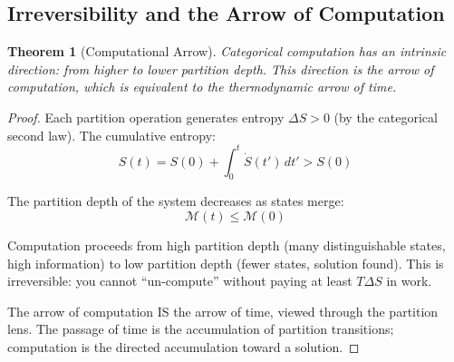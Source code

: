 \documentclass[twocolumn,10pt]{article}
\newtheorem{theorem}{Theorem}[section]
\theoremstyle{remark}
\newcommand{\Depth}{\mathcal{M}}
\begin{document}
\subsection{Irreversibility and the Arrow of Computation}

\begin{theorem}[Computational Arrow]
\label{thm:arrow}
Categorical computation has an intrinsic direction: from higher to lower partition depth. This direction is the \emph{arrow of computation}, which is equivalent to the thermodynamic arrow of time.
\end{theorem}

\begin{proof}
Each partition operation generates entropy $\Delta S > 0$ (by the categorical second law). The cumulative entropy:
\begin{equation}
    S(t) = S(0) + \int_0^t \dot{S}(t') \, dt' > S(0)
\end{equation}

The partition depth of the system decreases as states merge:
\begin{equation}
    \Depth(t) \leq \Depth(0)
\end{equation}

Computation proceeds from high partition depth (many distinguishable states, high information) to low partition depth (fewer states, solution found). This is irreversible: you cannot ``un-compute'' without paying at least $T\Delta S$ in work.

The arrow of computation IS the arrow of time, viewed through the partition lens. The passage of time is the accumulation of partition transitions; computation is the directed accumulation toward a solution.
\end{proof}
\end{document}
